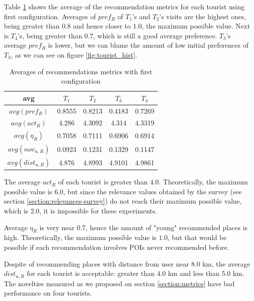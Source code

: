 Table \ref{table:config-1} shows the average of the recommendation metrics for each tourist using first configuration. Averages of $pref_R$ of $T_1$'s and $T_2$'s visits are the highest ones, being greater than $0.8$ and hence closer to $1.0$, the maximum possible value. Next is $T_4$'s, being greater than $0.7$, which is still a good average preference. $T_3$'s average $pref_R$ is lower, but we can blame the amount of low initial preferences of $T_3$, as we can see on figure \ref{fig:tourist_hist}.
\begin{table}[h!]
    \centering
    \begin{tabular}{ |c|c|c|c|c| } 
        \hline
        avg & $T_1$ & $T_2$ & $T_3$ & $T_4$ \\
        \hline
        \hline
        $avg(pref_R)$ & 0.8555 & 0.8213 & 0.4183 & 0.7269\\
        $avg(act_R)$ & 4.286 & 4.3092 & 4.314 & 4.3319 \\
        $avg(\eta_R)$ & 0.7058 & 0.7111 & 0.6906 & 0.6914 \\
        $avg(nov_{u,R})$ & 0.0923 & 0.1231 & 0.1329 & 0.1147 \\
        $avg(dist_{u,R})$ & 4.876 & 4.8993 & 4.9101 & 4.9861 \\
       
        \hline
    \end{tabular}
    \caption{Averages of recommendations metrics with first configuration}
    \label{table:config-1}
\end{table}

The average $act_R$ of each tourist is greater than $4.0$. Theoretically, the maximum possible value is $6.0$, but since the relevance values obtained by the survey (see section \ref{section:relevances-survey}) do not reach their maximum possible value, which is $2.0$, it is impossible for these experiments.

Average $\eta_R$ is very near $0.7$, hence the amount of "young" recommended places is high. Theoretically, the maximum possible value is $1.0$, but that would be possible if each recommendation involves POIs never recommended before. 

Despite of recommending places with distance from user near $8.0$ km, the average $dist_{u,R}$ for each tourist is acceptable: greater than $4.0$ km and less than $5.0$ km. The novelties measured as we proposed on section \ref{section:metrics} have bad performance on four tourists.

